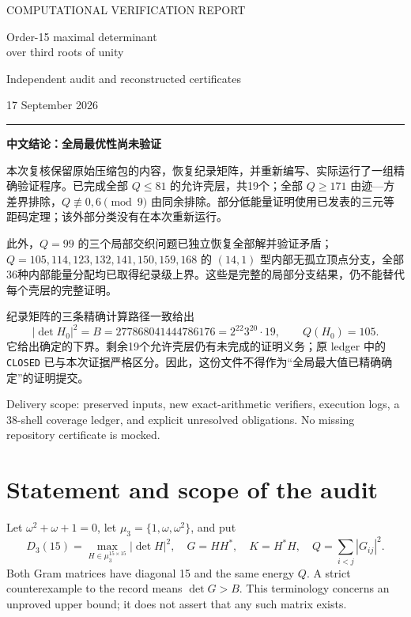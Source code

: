 \documentclass[11pt,a4paper]{article}
\newcommand{\muT}{\mu_3}\newcommand{\B}{B}\newcommand{\HH}{H^{*}}\newcommand{\QQ}{\mathbb Q}\newcommand{\ZZ}{\mathbb Z}\newcommand{\tr}{\operatorname{tr}}\newcommand{\diag}{\operatorname{diag}}\newcommand{\spec}{\operatorname{spec}}
\begin{document}
\thispagestyle{empty}
{\sffamily\color{accent}\large COMPUTATIONAL VERIFICATION REPORT}\par\vspace{10mm}
{\Huge\sffamily\color{ink} Order-15 maximal determinant\\[3mm]over third roots of unity}\par\vspace{5mm}
{\Large\sffamily Independent audit and reconstructed certificates}\par
{\large 17 September 2026}\par\vspace{8mm}
\hrule\vspace{5mm}
{\Large\bfseries 中文结论：全局最优性尚未验证}\par
本次复核保留原始压缩包的内容，恢复纪录矩阵，并重新编写、实际运行了一组精确验证程序。已完成全部 $Q\le81$ 的允许壳层，共19个；全部 $Q\ge171$ 由迹—方差界排除，$Q\not\equiv0,6\pmod9$ 由同余排除。部分低能量证明使用已发表的三元等距码定理；该外部分类没有在本次重新运行。

此外，$Q=99$ 的三个局部交织问题已独立恢复全部解并验证矛盾；$Q=105,114,123,132,141,150,159,168$ 的 $(14,1)$ 型内部无孤立顶点分支，全部36种内部能量分配均已取得纪录级上界。这些是完整的局部分支结果，仍不能替代每个壳层的完整证明。

纪录矩阵的三条精确计算路径一致给出
\[
 |\det H_0|^2=\B=277868041444786176=2^{22}3^{20}\cdot19,
 \qquad Q(H_0)=105.
\]
它给出确定的下界。剩余19个允许壳层仍有未完成的证明义务；原 ledger 中的 \texttt{CLOSED} 已与本次证据严格区分。因此，这份文件不得作为“全局最大值已精确确定”的证明提交。

\vfill
{\small\sffamily\color{ink} Delivery scope: preserved inputs, new exact-arithmetic verifiers, execution logs, a 38-shell coverage ledger, and explicit unresolved obligations. No missing repository certificate is mocked.}
\newpage

\section{Statement and scope of the audit}
Let $\omega^2+\omega+1=0$, let $\muT=\{1,\omega,\omega^2\}$, and put
\[
 D_3(15)=\max_{H\in\muT^{15\times15}} |\det H|^2,
 \quad G=HH^*,\quad K=H^*H,\quad
 Q=\sum_{i<j}|G_{ij}|^2.
\]
Both Gram matrices have diagonal 15 and the same energy $Q$. A strict counterexample to the record means $\det G>\B$. This terminology concerns an unproved upper bound; it does not assert that any such matrix exists.
\end{document}
